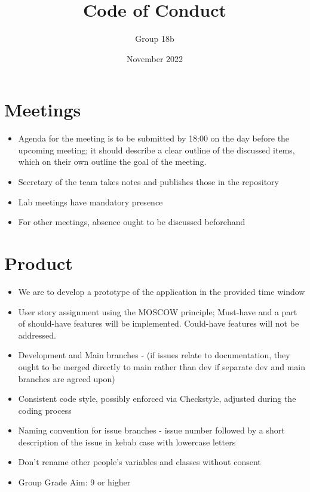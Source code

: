 \documentclass{article}
\title{Code of Conduct}
\author{Group 18b}
\date{November 2022}
\begin{document}
\maketitle

\section{Meetings}
    \begin{itemize}
        \item Agenda for the meeting is to be submitted by 18:00 on the day before the upcoming meeting; it should describe a clear outline of the discussed items, which on their own outline the goal of the meeting.
        \item Secretary of the team takes notes and publishes those in the repository
        \item Lab meetings have mandatory presence
        \item For other meetings, absence ought to be discussed beforehand
    \end{itemize}
\section{Product}
    \begin{itemize}
        \item  We are to develop a prototype of the application in the provided time window
        \item User story assignment using the MOSCOW principle; Must-have and a part of should-have features will be implemented. Could-have features will not be addressed.
        \item Development and Main branches - (if issues relate to documentation, they ought to be merged directly to main rather than dev if separate dev and main branches are agreed upon)
        \item Consistent code style, possibly enforced via Checkstyle, adjusted during the coding process
        \item Naming convention for issue branches - issue number followed by a short description of the issue in kebab case with lowercase letters
        \item Don't rename other people's variables and classes without consent
        \item Group Grade Aim: 9 or higher
    \end{itemize}
\end{document}
